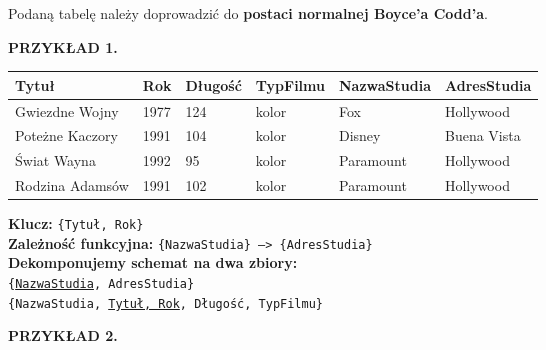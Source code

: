 \pagebreak

\horrule{0.5pt}
Podaną tabelę należy doprowadzić do
\textbf{postaci normalnej Boyce’a Codd’a}.\\
\horrule{0.5pt}

\vskip 0.5cm

\textbf{PRZYKŁAD 1.}

\vskip 0.5cm

\begin{adjustbox}{width=\columnwidth,center}
    \begin{tabular}{|l|l|l|l|l|l|}
        \hline
        \textbf{Tytuł} &
        \textbf{Rok} &
        \textbf{Długość} &
        \textbf{TypFilmu} &
        \textbf{NazwaStudia} &
        \textbf{AdresStudia}\\
        \hline
        Gwiezdne Wojny &
        1977 &
        124 &
        kolor &
        Fox &
        Hollywood \\
        \hline
        Poteżne Kaczory &
        1991 &
        104 &
        kolor &
        Disney &
        Buena Vista \\
        \hline
        Świat Wayna &
        1992 &
        95 &
        kolor &
        Paramount &
        Hollywood \\
        \hline
        Rodzina Adamsów &
        1991 &
        102 &
        kolor &
        Paramount &
        Hollywood \\
        \hline
    \end{tabular}
\end{adjustbox}

\vskip 0.5cm

\textbf{Klucz:} \texttt{\{Tytuł, Rok\}}\\
\textbf{Zależność funkcyjna:} \texttt{\{NazwaStudia\} --> \{AdresStudia\}}\\

\textbf{Dekomponujemy schemat na dwa zbiory:}\\
\texttt{\{\underline{NazwaStudia}, AdresStudia\}}\\
\texttt{\{NazwaStudia, \underline{Tytuł, Rok}, Długość, TypFilmu\}}\\

\vskip 0.5cm

\textbf{PRZYKŁAD 2.}

\vskip 0.5cm

